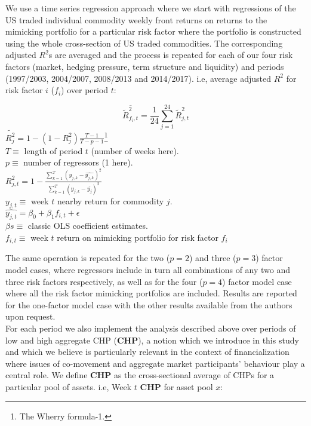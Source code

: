 \documentclass[12pt,]{article}
\let\rmarkdownfootnote\footnote%
\def\footnote{\protect\rmarkdownfootnote}
\begin{document}
We use a time series regression approach where we start with regressions
of the US traded individual commodity weekly front returns on returns to
the mimicking portfolio for a particular risk factor where the portfolio
is constructed using the whole cross-section of US traded commodities.
The corresponding adjusted \(R^{2}\)s are averaged and the process is
repeated for each of our four risk factors (market, hedging pressure,
term structure and liquidity) and periods (1997/2003, 2004/2007,
2008/2013 and 2014/2017). i.e, average adjusted \(R^{2}\) for risk
factor \(i\) (\(f_{i}\)) over period \(t\):

\[\overline{\tilde{R}_{f_{i},t}^{2}}=\frac{1}{24}\sum_{j=1}^{24}\tilde{R}_{j,t}^{2}\]
\(\tilde{R_{j}^{2}}=1-(1-R_{j}^{2})\frac{T-1}{T-p-1}\)\footnote{The
  Wherry formula-1.}\\
\(T\equiv\) length of period \(t\) (number of weeks here).\\
\(p\equiv\) number of regressors (1 here).\\
\(R_{j,t}^{2}=1-\frac{\sum_{k=1}^{T}(y_{j,k}-\hat{y_{j,k}})^{2}}{\sum_{k=1}^{T}(y_{j,k}-\overline{y_{j}})^{2}}\)\\
\(y_{j,t}\equiv\) week \(t\) nearby return for commodity \(j\).\\
\(\hat{y_{j,t}}=\beta_{0}+\beta_{1}f_{i,t}+\epsilon\)\\
\(\beta s \equiv\) classic OLS coefficient estimates.\\
\(f_{i,t}\equiv\) week \(t\) return on mimicking portfolio for risk
factor \(f_{i}\)

The same operation is repeated for the two (\(p=2\)) and three (\(p=3\))
factor model cases, where regressors include in turn all combinations of
any two and three risk factors respectively, as well as for the four
(\(p=4\)) factor model case where all the risk factor mimicking
portfolios are included. Results are reported for the one-factor model
case with the other results available from the authors upon request.\\
For each period we also implement the analysis described above over
periods of low and high aggregate CHP (\textbf{CHP}), a notion which we
introduce in this study and which we believe is particularly relevant in
the context of financialization where issues of co-movement and
aggregate market participants' behaviour play a central role. We define
\textbf{CHP} as the cross-sectional average of CHPs for a particular
pool of assets. i.e, Week \(t\) \textbf{CHP} for asset pool \(x\):
\end{document}
